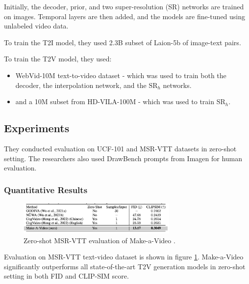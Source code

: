 Initially, the decoder, prior, and two super-resolution (SR) networks are trained on images. Temporal layers are then added, and the models are fine-tuned using unlabeled video data.

To train the T2I model, they used 2.3B subset of Laion-5b \cite{laion_5b} of image-text pairs.

To train the T2V model, they used:

\begin{itemize}
    \item WebVid-10M \cite{webvid_10m} text-to-video dataset - which was used to train both the decoder, the interpolation network, and the $\text{SR}_h$ networks.
    \item and a 10M subset from HD-VILA-100M \cite{hd_vila_100m} - which was used to train $\text{SR}_h$.
\end{itemize}






\subsection{Experiments}

They conducted evaluation on UCF-101 \cite{ucf_101} and MSR-VTT \cite{msr_vtt} datasets in zero-shot setting. The researchers also used DrawBench prompts from Imagen for human evaluation.




\subsubsection{Quantitative Results}

\begin{figure}[h]
    \centering
    \includegraphics[width=0.7\textwidth]{images/make_a_video/zero_shot_eval.png}
    \caption{Zero-shot MSR-VTT evaluation of Make-a-Video \cite{make_a_video}.}
    \label{fig:make_a_video_zeroshot_eval}
\end{figure}

Evaluation on MSR-VTT \cite{msr_vtt} text-video dataset is shown in figure \ref{fig:make_a_video_zeroshot_eval}. Make-a-Video significantly outperforms all state-of-the-art T2V generation models in zero-shot setting in both FID and CLIP-SIM score.

